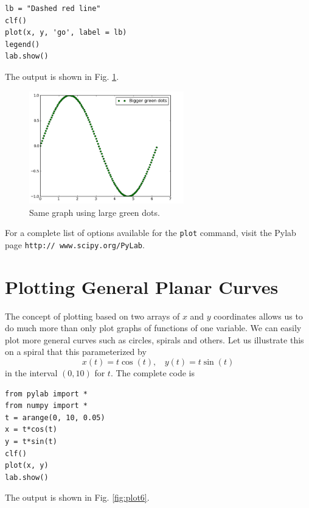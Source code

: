 \documentclass[article,A4,12pt]{llncs}
\begin{document}
\begin{verbatim}
lb = "Dashed red line"
clf()
plot(x, y, 'go', label = lb)
legend()
lab.show()
\end{verbatim}
\noindent
The output is shown in Fig. \ref{fig:plot5}.

\begin{figure}[!ht]
\begin{center}
\includegraphics[width=0.6\textwidth]{img/plot5.png}
\end{center}
\vspace{-6mm}
\caption{Same graph using large green dots.}
\label{fig:plot5}
\vspace{-4mm}
\end{figure}
\noindent
For a complete list of options available for the {\tt plot} command, 
visit the Pylab page {\tt http:// www.scipy.org/PyLab}.

\section{Plotting General Planar Curves}

The concept of plotting based on two arrays of $x$ and $y$ coordinates
allows us to do much more than only plot graphs of functions of one variable.
We can easily plot more general curves such as circles, spirals and others.
Let us illustrate this on a spiral that this parameterized 
by 
$$
x(t) = t \cos(t), \ \ \ \ 
y(t) = t \sin(t)
$$ 
in the interval $(0, 10)$ for $t$. The complete code is

\begin{verbatim}
from pylab import *
from numpy import *
t = arange(0, 10, 0.05)
x = t*cos(t)
y = t*sin(t)
clf()
plot(x, y)
lab.show()
\end{verbatim}
The output is shown in Fig. \ref{fig:plot6}.
\end{document}
